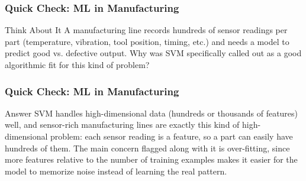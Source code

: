 \begin{frame}[fragile]\frametitle{Quick Check: ML in Manufacturing}
\begin{block}{Think About It}
A manufacturing line records hundreds of sensor readings per part (temperature, vibration,
tool position, timing, etc.) and needs a model to predict good vs. defective output. Why
was SVM specifically called out as a good algorithmic fit for this kind of problem?
\end{block}
\end{frame}

\begin{frame}[fragile]\frametitle{Quick Check: ML in Manufacturing}
\begin{block}{Answer}
SVM handles high-dimensional data (hundreds or thousands of features) well, and sensor-rich
manufacturing lines are exactly this kind of high-dimensional problem: each sensor reading
is a feature, so a part can easily have hundreds of them. The main concern flagged along
with it is over-fitting, since more features relative to the number of training examples
makes it easier for the model to memorize noise instead of learning the real pattern.
\end{block}
\end{frame}






%
%
%
%
%
%


